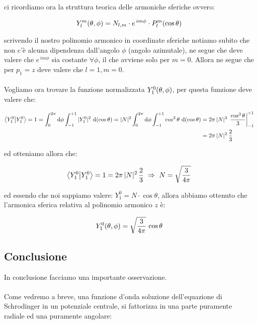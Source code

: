	ci ricordiamo ora la struttura teorica delle armoniche sferiche ovvero:

\begin{align*}
	Y_l^m\qty(\theta, \phi) = N_{l, m} \cdot e^{\, im\phi} \cdot P_l^m\qty(\cos\theta)
\end{align*}

	scrivendo il nostro polinomio armonico in coordinate sferiche notiamo subito che non c'è alcuna dipendenza dall'angolo $\phi$ (angolo azimutale), ne segue che deve valere che $e^{\, im\phi}$ sia costante $\forall \phi$, il che avviene solo per $m = 0$. Allora ne segue che per $p_1 = z$ deve valere che $ l=1, m=0 $.
	\\
	\\
	Vogliamo ora trovare la funzione normalizzata $Y_1^0\qty(\theta, \phi)$, per questa funzione deve valere che:
	
\begin{align*}
	\braket{Y_1^0} = 1 = \int_0^{2\pi} \dd \phi \int_{-1}^{+1} |Y_1^0|^2 \, \dd(\cos\theta) = |N|^2 \int_0^{2\pi} \dd \phi \int_{-1}^{+1} \cos^2\theta \, \dd(\cos\theta) &=  2\pi \, |N|^2 \, \left. \frac{\cos^3\theta}{3} \right|_{-1}^{+1} \\
	& = 2\pi \, |N|^2 \, \frac{2}{3}
\end{align*}

	ed otteniamo allora che:
	
\begin{align*}
	\braket{Y_1^0} = 1 = 2\pi \, |N|^2 \, \frac{2}{3} \, \, \Rightarrow \,\, N = \sqrt{\frac{3}{4\pi}}
\end{align*}

	ed essendo che noi sappiamo valere: $Y_1^0 = N \cdot \cos\theta$, allora abbiamo ottenuto che l'armonica sferica relativa al polinomio armonico $z$ è:
	
\begin{align*}
	Y_1^0\qty(\theta, \phi) = \sqrt{\frac{3}{4\pi}} \, \cos\theta
\end{align*}

\subsection{Conclusione}

	In conclusione facciamo una importante osservazione.
	\\
	\\
	Come vedremo a breve, una funzione d'onda soluzione dell'equazione di Schrodinger in un potenziale centrale, si fattorizza in una parte puramente radiale ed una puramente angolare:

